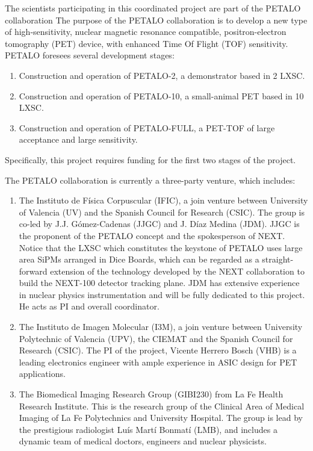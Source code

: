 The scientists participating in this coordinated project are part of the PETALO collaboration
The purpose of the PETALO collaboration is to develop a new type of  high-sensitivity, nuclear magnetic resonance compatible, positron-electron tomography (PET) device, with enhanced Time Of Flight (TOF) sensitivity. PETALO foresees several development stages:
\begin{enumerate}
\item Construction and operation of PETALO-2, a demonstrator based in 2 LXSC. 
\item Construction and operation of PETALO-10, a small-animal PET based in 10 LXSC.
\item Construction and operation of PETALO-FULL, a PET-TOF of large acceptance and large sensitivity.
\end{enumerate}

Specifically, this project 
requires funding for the first two stages of the project. 

The PETALO collaboration is currently a three-party venture, which includes:
\begin{enumerate}
\item The Instituto de Física Corpuscular (IFIC), a join venture between University of Valencia (UV) and the Spanish Council for Research (CSIC). The group is co-led by J.J. G\'omez-Cadenas (JJGC) and J. Díaz Medina (JDM).  JJGC is the proponent of the PETALO concept and the spokesperson of NEXT. Notice that the LXSC which constitutes the keystone of PETALO uses large area SiPMs arranged in Dice Boards, which can be regarded   
as a straight-forward extension of the technology developed by the NEXT collaboration to build the NEXT-100 detector tracking plane. JDM has extensive experience in nuclear physics instrumentation and will be fully dedicated to this project. He acts as PI and overall coordinator. 
\item The Instituto de Imagen Molecular (I3M), a join venture between University Polytechnic of Valencia (UPV), the CIEMAT and the Spanish Council for Research (CSIC). The PI of the project, Vicente Herrero Bosch (VHB) is a leading electronics engineer with ample experience in ASIC design for PET applications. 
\item The  Biomedical Imaging Research Group (GIBI230) from La Fe Health Research Institute. This is the research group of the Clinical Area of Medical Imaging of La Fe Polytechnics and University Hospital. The group is lead by the prestigious radiologist Luís Martí Bonmatí (LMB), and includes a dynamic team of medical doctors, engineers and nuclear physicists.  
\end{enumerate}

